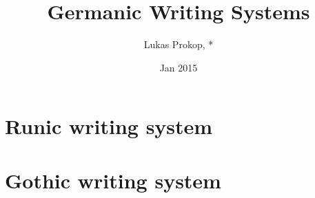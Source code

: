 \documentclass[a4paper]{article}
\author{Lukas Prokop, *}
\title{Germanic Writing Systems}
\date{Jan 2015}
\begin{document}
\tableofcontents

\section{Runic writing system}

\section{Gothic writing system}
\end{document}
